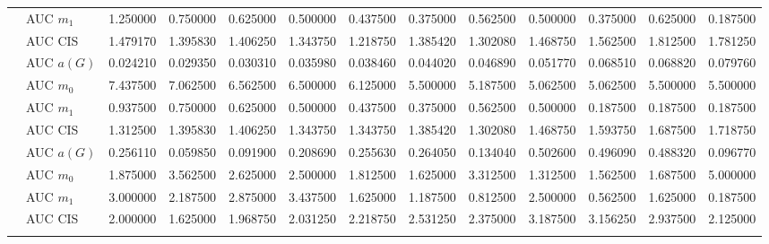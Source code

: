 \begin{table}[htbp]
\begin{tabular}{llrrrrrrrrrrr}
    & AUC $m_1$ & 1.250000 & 0.750000 & 0.625000 & 0.500000 & 0.437500 & 0.375000 & 0.562500 & 0.500000 & 0.375000 & 0.625000 & 0.187500 \\
    & AUC CIS & 1.479170 & 1.395830 & 1.406250 & 1.343750 & 1.218750 & 1.385420 & 1.302080 & 1.468750 & 1.562500 & 1.812500 & 1.781250 \\
    \addlinespace
    \multirow{4}{*}{degree} & AUC $a(G)$ & 0.024210 & 0.029350 & 0.030310 & 0.035980 & 0.038460 & 0.044020 & 0.046890 & 0.051770 & 0.068510 & 0.068820 & 0.079760 \\
    & AUC $m_0$ & 7.437500 & 7.062500 & 6.562500 & 6.500000 & 6.125000 & 5.500000 & 5.187500 & 5.062500 & 5.062500 & 5.500000 & 5.500000 \\
    & AUC $m_1$ & 0.937500 & 0.750000 & 0.625000 & 0.500000 & 0.437500 & 0.375000 & 0.562500 & 0.500000 & 0.187500 & 0.187500 & 0.187500 \\
    & AUC CIS & 1.312500 & 1.395830 & 1.406250 & 1.343750 & 1.343750 & 1.385420 & 1.302080 & 1.468750 & 1.593750 & 1.687500 & 1.718750 \\
    \addlinespace
    \multirow{4}{*}{random} & AUC $a(G)$ & 0.256110 & 0.059850 & 0.091900 & 0.208690 & 0.255630 & 0.264050 & 0.134040 & 0.502600 & 0.496090 & 0.488320 & 0.096770 \\
    & AUC $m_0$ & 1.875000 & 3.562500 & 2.625000 & 2.500000 & 1.812500 & 1.625000 & 3.312500 & 1.312500 & 1.562500 & 1.687500 & 5.000000 \\
    & AUC $m_1$ & 3.000000 & 2.187500 & 2.875000 & 3.437500 & 1.625000 & 1.187500 & 0.812500 & 2.500000 & 0.562500 & 1.625000 & 0.187500 \\
    & AUC CIS & 2.000000 & 1.625000 & 1.968750 & 2.031250 & 2.218750 & 2.531250 & 2.375000 & 3.187500 & 3.156250 & 2.937500 & 2.125000 \\
    \addlinespace
    \bottomrule
  \end{tabular}
\end{table}

